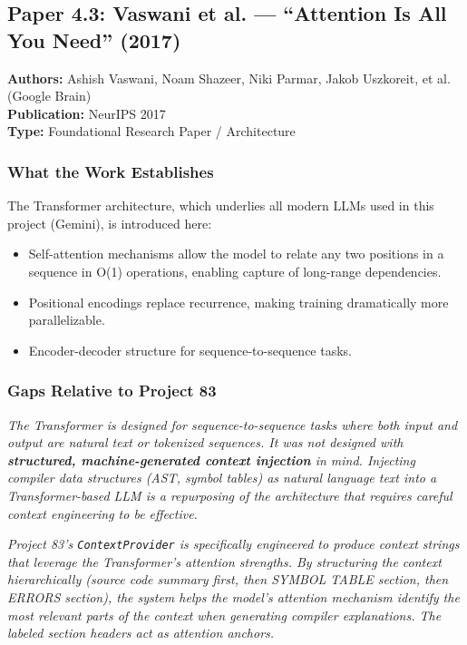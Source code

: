 \documentclass[a4paper,11pt]{article}
\newcommand{\papergap}[1]{%
  \begin{tcolorbox}[colback=red!5!white, colframe=red!60!black, title={Research Gap Identified}]
  \textit{#1}
  \end{tcolorbox}
}
\newcommand{\oursolution}[1]{%
  \begin{tcolorbox}[colback=green!5!white, colframe=green!60!black, title={How Project 83 Solves This Gap}]
  \textit{#1}
  \end{tcolorbox}
}
\begin{document}
\subsection{Paper 4.3: Vaswani et al. --- ``Attention Is All You Need'' (2017)}

\begin{tcolorbox}[colback=gray!5, colframe=gray!40]
\textbf{Authors:} Ashish Vaswani, Noam Shazeer, Niki Parmar, Jakob Uszkoreit, et al. (Google Brain) \\
\textbf{Publication:} NeurIPS 2017 \\
\textbf{Type:} Foundational Research Paper / Architecture
\end{tcolorbox}

\subsubsection{What the Work Establishes}

The Transformer architecture, which underlies all modern LLMs used in this project (Gemini), is introduced here:
\begin{itemize}
    \item Self-attention mechanisms allow the model to relate any two positions in a sequence in O(1) operations, enabling capture of long-range dependencies.
    \item Positional encodings replace recurrence, making training dramatically more parallelizable.
    \item Encoder-decoder structure for sequence-to-sequence tasks.
\end{itemize}

\subsubsection{Gaps Relative to Project 83}

\papergap{The Transformer is designed for sequence-to-sequence tasks where both input and output are natural text or tokenized sequences. It was not designed with \textbf{structured, machine-generated context injection} in mind. Injecting compiler data structures (AST, symbol tables) as natural language text into a Transformer-based LLM is a repurposing of the architecture that requires careful context engineering to be effective.}

\oursolution{Project 83's \texttt{ContextProvider} is specifically engineered to produce context strings that leverage the Transformer's attention strengths. By structuring the context hierarchically (source code summary first, then SYMBOL TABLE section, then ERRORS section), the system helps the model's attention mechanism identify the most relevant parts of the context when generating compiler explanations. The labeled section headers act as attention anchors.}
\end{document}
